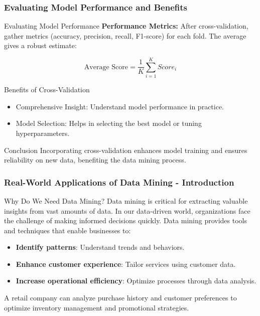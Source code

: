 \documentclass[aspectratio=169]{beamer}
\begin{document}
\begin{frame}[fragile]
    \frametitle{Evaluating Model Performance and Benefits}
    \begin{block}{Evaluating Model Performance}
        \textbf{Performance Metrics:} After cross-validation, gather metrics (accuracy, precision, recall, F1-score) for each fold. The average gives a robust estimate:
        
        \begin{equation}
        \text{Average Score} = \frac{1}{K} \sum_{i=1}^{K} Score_i
        \end{equation}
    \end{block}

    \begin{block}{Benefits of Cross-Validation}
        \begin{itemize}
            \item Comprehensive Insight: Understand model performance in practice.
            \item Model Selection: Helps in selecting the best model or tuning hyperparameters.
        \end{itemize}
    \end{block}

    \begin{block}{Conclusion}
        Incorporating cross-validation enhances model training and ensures reliability on new data, benefiting the data mining process.
    \end{block}
\end{frame}

\begin{frame}[fragile]
    \frametitle{Real-World Applications of Data Mining - Introduction}
    \begin{block}{Why Do We Need Data Mining?}
        Data mining is critical for extracting valuable insights from vast amounts of data. In our data-driven world, organizations face the challenge of making informed decisions quickly. Data mining provides tools and techniques that enable businesses to:
    \end{block}
    \begin{itemize}
        \item \textbf{Identify patterns}: Understand trends and behaviors.
        \item \textbf{Enhance customer experience}: Tailor services using customer data.
        \item \textbf{Increase operational efficiency}: Optimize processes through data analysis.
    \end{itemize}
    \begin{example}
        A retail company can analyze purchase history and customer preferences to optimize inventory management and promotional strategies.
    \end{example}
\end{frame}
\end{document}
